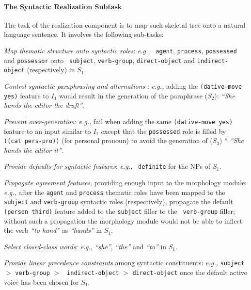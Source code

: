 \paragraph{The Syntactic Realization Subtask} 
The task of the realization component is to map such skeletal tree onto a
natural language sentence. It involves the following sub-tasks:
\begin{zenumerate} 
\item {\em Map thematic structure onto syntactic roles}: {\em e.g.,} {\tt
    agent}, {\tt process}, {\tt possessed} and {\tt possessor} onto {\tt
    subject}, {\tt verb-group}, {\tt direct-object} and {\tt indirect-object}
    (respectively) in $S_1$.

\item {\em Control syntactic paraphrasing and alternations} \cite{levin}:
  {\em e.g.,} adding the {\tt (dative-move yes)} feature to $I_1$ would
  result in the generation of the paraphrase ($S_2$): {\em ``She hands the
    editor the draft''}.

\item {\em Prevent over-generation}: 
{\em e.g.,} fail when adding the same {\tt (dative-move yes)} feature to an
  input similar to $I_1$ except that the {\tt possessed} role is filled by {\tt
  ((cat pers-pro))} (for personal pronoun) to avoid the generation of ($S_3$) *
  {\em ``She hands the editor it''}.

\item {\em Provide defaults for syntactic features}: {\em e.g.,} {\tt
    definite} for the NPs of $S_1$.

\item {\em Propagate agreement features}, providing enough input to the
  morphology module: {\em e.g.,} after the {\tt agent} and {\tt process}
  thematic roles have been mapped to the {\tt subject} and {\tt verb-group}
  syntactic roles (respectively), propagate the default {\tt (person
    third)} feature added to the {\tt subject} filler to the {\tt
    verb-group} filler; without such a propagation the morphology module
  would not be able to inflect the verb {\em ``to hand''} as {\em
    ``hands''} in $S_1$.

\item {\em Select closed-class words}: {\em e.g.,} {\em ``she''}, {\em
    ``the''} and {\em ``to''} in $S_1$.

\item {\em Provide linear precedence constraints} among syntactic
  constituents: {\em e.g.,} {\tt subject} $>$ {\tt verb-group} $>$ {\tt
    indirect-object} $>$ {\tt direct-object} once the default active voice
  has been chosen for $S_1$.


\end{zenumerate}
